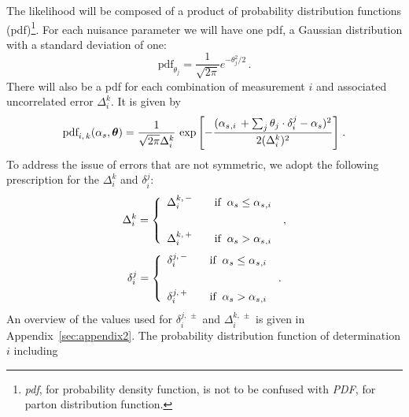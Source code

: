 The likelihood will be composed of a product of probability
distribution functions (pdf)\footnote{
\textit{pdf}, for probability density function, is not to be confused with \textit{PDF}, for parton distribution function.
}.
%
For each nuisance parameter we will have one pdf, a Gaussian
distribution with a standard deviation of one:
% 
\begin{equation}
    \text{pdf}_{\theta_j} = 
    \frac{1}{\sqrt{2\pi}} e^{-\theta_j^2/2}
    \,.
\end{equation}
%
There will also be a pdf for each combination of measurement $i$ and
associated uncorrelated error $\Delta^k_i$. 
%
It is given by
% 
\begin{equation}
\text{pdf}_{i,\,k}(\as, \bm{\theta}) =
    \frac{1}{\sqrt{2\pi} \Delta_i^k}
    \, \exp{ \displaystyle\left[
    -\frac{
        (\as {}_{,i} \, + \sum_j \theta_j \cdot \delta_i^j - \as)^2
        }{
        2(\Delta_i^k)^2
        }
    \right] }
    \;.
\end{equation}
%
To address the issue of errors that are not symmetric, we adopt the
following prescription for the $\Delta_i^k$ and $\delta_i^j$:
% 
\begin{equation}
\Delta_i^k =
    \left\{
    \begin{array}{ll}
        \displaystyle
        \Delta_i^{k,\,-}
        & \quad \text{if} \;\; \alpha_s \le \alpha_s {}_{,i}
        \\[20pt]
        \displaystyle
        \Delta_i^{k,\,+}
        & \quad \text{if} \;\; \alpha_s > \alpha_s {}_{,i}
    \end{array}
    \right. 
    \;,
\end{equation}
% 
\begin{equation}
\delta_i^j =
    \left\{
    \begin{array}{ll}
        \displaystyle
        \delta_i^{j,\,-}
        & \quad \text{if} \;\; \alpha_s \le \alpha_s {}_{,i}
        \\[20pt]
        \displaystyle
        \delta_i^{j,\,+}
        & \quad \text{if} \;\; \alpha_s > \alpha_s {}_{,i}
    \end{array}
    \right. 
    \;.
\end{equation}
% 
An overview of the values used for $\delta_i^{j,\,\pm}$ and $\Delta_i^{k,\,\pm}$
is given in Appendix~\ref{sec:appendix2}.
% 
The probability distribution function of determination $i$ including
